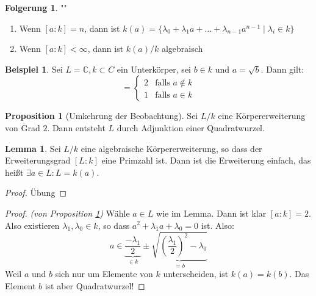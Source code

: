 \documentclass[12pt,parskip=full]{scrartcl}
\newcommand{\setC}{\mathbb{C}}
\theoremstyle{definition}
\newtheorem{corollary}[theorem]{Folgerung}
\newtheorem{proposition}[theorem]{Proposition}
\newtheorem{lemma}[theorem]{Lemma}
\newtheorem{example}[theorem]{Beispiel}
\theoremstyle{remark}
\begin{document}
	\begin{corollary}""
		\begin{enumerate}
			\item Wenn $[a:k] = n$, dann ist $k(a) = \{ \lambda_0 + \lambda_1 a + \dots + \lambda_{n-1} a^{n-1} \mid \lambda_i \in k \}$
			\item Wenn $[a:k] < \infty$, dann ist $k(a)/k$ algebraisch
		\end{enumerate}
	\end{corollary}

	\begin{example}
		Sei $L = \setC, k \subset C$ ein Unterkörper, sei $b \in k$ und $a = \sqrt{b}$. Dann gilt:
		\begin{equation*}
			[k(a): k] = \begin{cases}
				2 & \text{falls $a \notin k$} \\
				1 & \text{falls $a \in k$}
			\end{cases}
		\end{equation*}
	\end{example}

	\begin{proposition}[Umkehrung der Beobachtung]
		\label{prop:umkehrungDerBeobachtung}
		Sei $L/k$ eine Körpererweiterung von Grad $2$. Dann entsteht $L$ durch Adjunktion einer Quadratwurzel.
	\end{proposition}

	\begin{lemma}
		Sei $L/k$ eine algebraische Körpererweiterung, so dass der Erweiterungsgrad $[L:k]$ eine Primzahl ist. Dann ist die Erweiterung einfach, das heißt $\exists a \in L: L = k(a)$.
	\end{lemma}

	\begin{proof}
		Übung
	\end{proof}

	\begin{proof}\textit{(von Proposition \ref{prop:umkehrungDerBeobachtung})}
		Wähle $a \in L$ wie im Lemma. Dann ist klar $[a:k] = 2$. Also existieren $\lambda_1, \lambda_0 \in k$, so dass $a^2 + \lambda_1 a + \lambda_0 = 0$ ist. Also:
		\begin{equation*}
			a \in \underbrace{\frac{- \lambda_1}{2}}_{\in k} \pm \underbrace{\sqrt{\left( \frac{\lambda_1}{2} \right)^2 - \lambda_0}}_{=b}
		\end{equation*}
		Weil $a$ und $b$ sich nur um Elemente von $k$ unterscheiden, ist $k(a) = k(b)$. Das Element $b$ ist aber Quadratwurzel!
	\end{proof}
\end{document}

